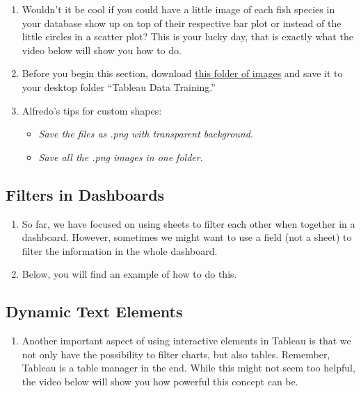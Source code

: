 \documentclass[
]{book}
\providecommand{\tightlist}{%
  \setlength{\itemsep}{0pt}\setlength{\parskip}{0pt}}
\begin{document}
\begin{enumerate}
\def\labelenumi{\arabic{enumi}.}
\item
  Wouldn't it be cool if you could have a little image of each fish species in your database show up on top of their respective bar plot or instead of the little circles in a scatter plot? This is your lucky day, that is exactly what the video below will show you how to do.
\item
  Before you begin this section, download \href{https://github.com/NCEAS/data-training-picrc-cos/raw/main/images/TNC\%20-\%20Fish\%20Images.zip}{this folder of images} and save it to your desktop folder ``Tableau Data Training.''
\item
  Alfredo's tips for custom shapes:

  \begin{itemize}
  \tightlist
  \item
    \emph{Save the files as .png with transparent background}.
  \item
    \emph{Save all the .png images in one folder}.
  \end{itemize}
\end{enumerate}

\hypertarget{filters-in-dashboards}{%
\subsection{Filters in Dashboards}\label{filters-in-dashboards}}

\begin{enumerate}
\def\labelenumi{\arabic{enumi}.}
\item
  So far, we have focused on using sheets to filter each other when together in a dashboard. However, sometimes we might want to use a field (not a sheet) to filter the information in the whole dashboard.
\item
  Below, you will find an example of how to do this.
\end{enumerate}

\hypertarget{dynamic-text-elements}{%
\subsection{Dynamic Text Elements}\label{dynamic-text-elements}}

\begin{enumerate}
\def\labelenumi{\arabic{enumi}.}
\tightlist
\item
  Another important aspect of using interactive elements in Tableau is that we not only have the possibility to filter charts, but also tables. Remember, Tableau is a table manager in the end. While this might not seem too helpful, the video below will show you how powerful this concept can be.
\end{enumerate}
\end{document}
